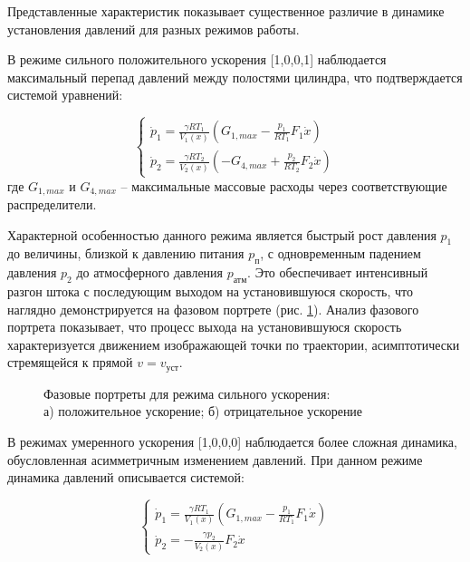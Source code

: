 Представленные характеристик показывает существенное различие в динамике установления давлений для разных режимов работы.

В режиме сильного положительного ускорения [1,0,0,1] наблюдается максимальный
перепад давлений между полостями цилиндра, что подтверждается системой уравнений:

$$\begin{cases}
		\dot{p}_1 = \frac{\gamma RT_1}{V_1(x)}(G_{1,max} - \frac{p_1}{RT_1}F_1\dot{x}) \\
		\dot{p}_2 = \frac{\gamma RT_2}{V_2(x)}(-G_{4,max} + \frac{p_2}{RT_2}F_2\dot{x})
	\end{cases}$$
где $G_{1,max}$ и $G_{4,max}$ -- максимальные массовые расходы через соответствующие распределители.

Характерной особенностью данного режима является быстрый рост давления $p_1$ до величины, близкой к давлению питания
$p_\text{п}$, с одновременным падением давления $p_2$ до атмосферного давления $p_\text{атм}$. Это обеспечивает интенсивный
разгон штока с последующим выходом на установившуюся скорость, что наглядно демонстрируется на
фазовом портрете (рис. \ref{fig:pp_strong_accelration}). Анализ фазового портрета показывает,
что процесс выхода на установившуюся скорость характеризуется движением изображающей
точки по траектории, асимптотически стремящейся к прямой $v = v_\text{уст}$.

\begin{figure}[htbp]
	\caption{Фазовые портреты для режима сильного ускорения:\\
		а) положительное ускорение; б) отрицательное ускорение}
	\label{fig:pp_strong_accelration}
\end{figure}

В режимах умеренного ускорения [1,0,0,0]
наблюдается более сложная динамика, обусловленная асимметричным изменением давлений.
При данном режиме динамика давлений описывается системой:

\begin{equation*}
	\begin{cases}
		\dot{p}_1 = \frac{\gamma RT_1}{V_1(x)}(G_{1,max} - \frac{p_1}{RT_1}F_1\dot{x}) \\
		\dot{p}_2 = -\frac{\gamma p_2}{V_2(x)}F_2\dot{x}
	\end{cases}
\end{equation*}


